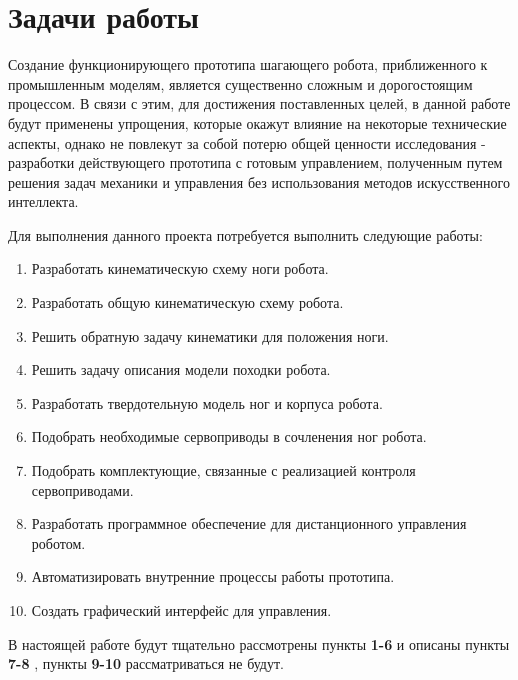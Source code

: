 \section{Задачи работы}\label{C1_1}

Создание функционирующего прототипа шагающего робота, приближенного к промышленным моделям, является существенно сложным и дорогостоящим процессом. В связи с этим, для достижения поставленных целей, в данной работе будут применены упрощения, которые окажут влияние на некоторые технические аспекты, однако не повлекут за собой потерю общей ценности исследования - разработки действующего прототипа с готовым управлением, полученным путем решения задач механики и управления без использования методов искусственного интеллекта.


 
Для выполнения данного проекта потребуется выполнить следующие работы:
\begin{enumerate}
	\item Разработать кинематическую схему ноги робота.
	\item Разработать общую кинематическую схему робота.
	\item Решить обратную задачу кинематики для положения ноги.
	\item Решить задачу описания модели походки робота.
	\item Разработать твердотельную модель ног и корпуса робота.
	\item Подобрать необходимые сервоприводы в сочленения ног робота.
	\item Подобрать комплектующие, связанные с реализацией контроля сервоприводами.
	\item Разработать программное обеспечение для дистанционного управления роботом.
	\item Автоматизировать внутренние процессы работы прототипа. 
	\item Создать графический интерфейс для управления.
\end{enumerate}
В настоящей работе будут тщательно рассмотрены пункты \textbf{1-6} и описаны пункты \textbf{7-8} , пункты \textbf{9-10} рассматриваться не будут.
